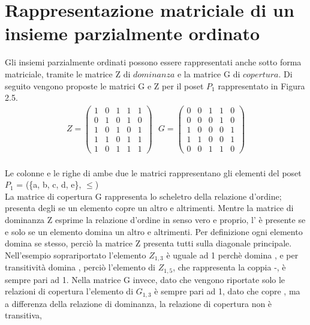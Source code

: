 \documentclass[a4paper,12pt, openright]{report}
\begin{document}
\section{Rappresentazione matriciale di un insieme parzialmente ordinato}

Gli insiemi parzialmente ordinati possono essere rappresentati anche sotto forma matriciale, tramite le matrice Z di $\textit{dominanza}$
e la matrice G di $\textit{copertura}$. Di seguito vengono proposte le matrici G e Z per il poset $P_1$ rappresentato in Figura 2.5. 
\begin{align}
    Z = 
    \left( \begin{array}{ccccc} 1 & 0 & 1 & 1 & 1 \\
        0 & 1 & 0 & 1 & 0\\
        1 & 0 & 1 & 0 & 1\\
        1 & 1 & 0 & 1 & 1\\
        1 & 0 & 1 & 1 & 1 \end{array} \right)
    \mbox{                  }
    G = 
    \left( \begin{array}{ccccc} 0 & 0 & 1 & 1 & 0 \\
        0 & 0 & 0 & 1 & 0\\
        1 & 0 & 0 & 0 & 1\\
        1 & 1 & 0 & 0 & 1\\
        0 & 0 & 1 & 1 & 0 \end{array} \right)
\end{align}
\\
Le colonne e le righe di ambe due le matrici rappresentano gli elementi del poset $P_1$ = (\{a, b, c, d, e\}, $\leq$) \\
La matrice di copertura G rappresenta lo scheletro della relazione d'ordine; presenta degli  se un elemento copre un 
altro e  altrimenti. Mentre la matrice di dominanza Z esprime la relazione d'ordine in senso vero e proprio, l'
è presente se e solo se un elemento domina un altro e  altrimenti. Per definizione ogni elemento domina se stesso, 
perciò la matrice Z presenta tutti  sulla diagonale principale. \\
Nell'esempio soprariportato l'elemento $Z_{1,3}$ è uguale ad 1 perchè  domina , e per transitività  domina
, perciò l'elemento di $Z_{1,5}$, che rappresenta la coppia -, è sempre pari ad 1. 
Nella matrice G invece, dato che vengono riportate solo le relazioni di copertura l'elemento di $G_{1,3}$ è sempre pari ad 1, 
dato che  copre , ma a differenza della relazione di dominanza, la relazione di copertura non è transitiva, 
\end{document}

